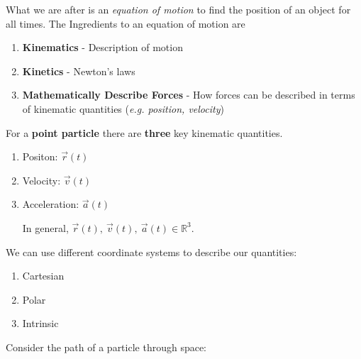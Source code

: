 \documentclass[10pt]{scrartcl}
\begin{document}
\setcounter{section}{-1}
\addtocounter{lecture}{-1}
\setcounter{page}{3}

What we are after is an \emph{equation of motion} to find the position of an object for all times. The Ingredients to an equation of motion are

\begin{enumerate}[1)]
\item \textbf{Kinematics} - Description of motion 
\item \textbf{Kinetics} - Newton's laws
\item \textbf{Mathematically Describe Forces} - How forces can be described in terms of kinematic quantities (\textit{e.g. position, velocity})
\end{enumerate}





For a \textbf{point particle} there are \textbf{three} key kinematic quantities.\begin{enumerate}[1)]
\item Positon: $\vec{r}(t)$
\item Velocity: $\vec{v}(t)$
\item Acceleration: $\vec{a}(t)$

In general, $\vec{r}(t),~\vec{v}(t),~\vec{a}(t) \in \mathbb{R}^3$. 
\end{enumerate}\vspace*{5pt}


We can use different coordinate systems to describe our quantities:
\begin{enumerate}[1)]
\item Cartesian
\item Polar
\item Intrinsic	
\end{enumerate}

Consider the path of a particle through space:
\end{document}
